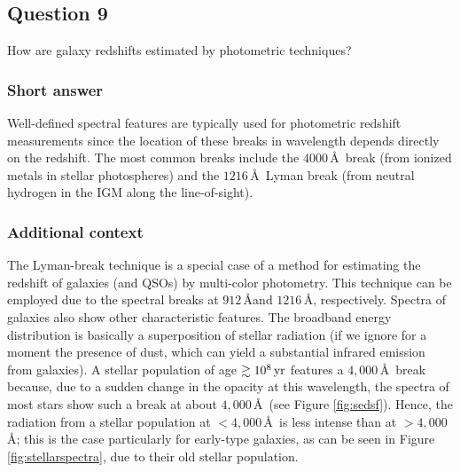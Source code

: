 \documentclass[a4paper,10pt]{article}
\begin{document}

\newpage
\subsection{Question 9}

How are galaxy redshifts estimated by photometric techniques?

\subsubsection{Short answer}

Well-defined spectral features are typically used for photometric redshift measurements since the location of these breaks in wavelength depends directly on the redshift. The most common breaks include the $4000$\,\AA~break (from ionized metals in stellar photospheres) and the $1216$\,\AA~Lyman break (from neutral hydrogen in the IGM along the line-of-sight).

\subsubsection{Additional context}

The Lyman-break technique is a special case of a method for estimating the redshift of galaxies (and QSOs) by multi-color photometry. This technique can be employed due to the spectral breaks at $912\,$\AA and $1216\,$\AA, respectively. Spectra of galaxies also show other characteristic features. The broadband energy distribution is basically a superposition of stellar radiation (if we ignore for a moment the presence of dust, which can yield a substantial infrared emission from galaxies). A stellar population of age $\gtrsim10^8\,{\rm yr}$ features a $4,000$\,\AA~break because, due to a sudden change in the opacity at this wavelength, the spectra of most stars show such a break at about $4,000$\,\AA~(see Figure \ref{fig:sedsf}). Hence, the radiation from a stellar population at $<4,000$\,\AA~is less intense than at $>4,000$\,\AA; this is the case particularly for early-type galaxies, as can be seen in Figure \ref{fig:stellarspectra}, due to their old stellar population.
\end{document}
